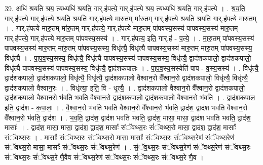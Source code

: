 \documentclass[17pt]{extarticle}
\begin{document}
39. अधि॑ श्रयति श्रय॒ त्यध्यधि॑ श्रयति॒ गार्.ह॑पत्ये॒ गार्.ह॑पत्ये श्रय॒ त्यध्यधि॑ श्रयति॒ गार्.ह॑पत्ये । . श्र॒य॒ति॒ गार्.ह॑पत्ये॒ गार्.ह॑पत्ये श्रयति श्रयति॒ गार्.ह॑पत्ये मारु॒तम् मा॑रु॒तम् गार्.ह॑पत्ये श्रयति श्रयति॒ गार्.ह॑पत्ये मारु॒तम् । . गार्.ह॑पत्ये मारु॒तम् मा॑रु॒तम् गार्.ह॑पत्ये॒ गार्.ह॑पत्ये मारु॒तम् पा॑पवस्य॒सस्य॑ पापवस्य॒सस्य॑ मारु॒तम् गार्.ह॑पत्ये॒ गार्.ह॑पत्ये मारु॒तम् पा॑पवस्य॒सस्य॑ । . गार्.ह॑पत्य॒ इति॒ गार्.ह॑ - प॒त्ये॒ । . मा॒रु॒तम् पा॑पवस्य॒सस्य॑ पापवस्य॒सस्य॑ मारु॒तम् मा॑रु॒तम् पा॑पवस्य॒सस्य॒ विधृ॑त्यै॒ विधृ॑त्यै पापवस्य॒सस्य॑ मारु॒तम् मा॑रु॒तम् पा॑पवस्य॒सस्य॒ विधृ॑त्यै । . पा॒प॒व॒स्य॒सस्य॒ विधृ॑त्यै॒ विधृ॑त्यै पापवस्य॒सस्य॑ पापवस्य॒सस्य॒ विधृ॑त्यै॒ द्वाद॑शकपालो॒ द्वाद॑शकपालो॒ विधृ॑त्यै पापवस्य॒सस्य॑ पापवस्य॒सस्य॒ विधृ॑त्यै॒ द्वाद॑शकपालः । . पा॒प॒व॒स्य॒सस्येति॑ पाप - व॒स्य॒सस्य॑ । . विधृ॑त्यै॒ द्वाद॑शकपालो॒ द्वाद॑शकपालो॒ विधृ॑त्यै॒ विधृ॑त्यै॒ द्वाद॑शकपालो वैश्वान॒रो वै᳚श्वान॒रो द्वाद॑शकपालो॒ विधृ॑त्यै॒ विधृ॑त्यै॒ द्वाद॑शकपालो वैश्वान॒रः । . विधृ॑त्या॒ इति॒ वि - धृ॒त्यै॒ । . द्वाद॑शकपालो वैश्वान॒रो वै᳚श्वान॒रो द्वाद॑शकपालो॒ द्वाद॑शकपालो वैश्वान॒रो भ॑वति भवति वैश्वान॒रो द्वाद॑शकपालो॒ द्वाद॑शकपालो वैश्वान॒रो भ॑वति । . द्वाद॑शकपाल॒ इति॒ द्वाद॑श - क॒पा॒लः॒ । . वै॒श्वा॒न॒रो भ॑वति भवति वैश्वान॒रो वै᳚श्वान॒रो भ॑वति॒ द्वाद॑श॒ द्वाद॑श भवति वैश्वान॒रो वै᳚श्वान॒रो भ॑वति॒ द्वाद॑श । . भ॒व॒ति॒ द्वाद॑श॒ द्वाद॑श भवति भवति॒ द्वाद॑श॒ मासा॒ मासा॒ द्वाद॑श भवति भवति॒ द्वाद॑श॒ मासाः᳚ । . द्वाद॑श॒ मासा॒ मासा॒ द्वाद॑श॒ द्वाद॑श॒ मासाः᳚ संॅवथ्स॒रः सं॑ॅवथ्स॒रो मासा॒ द्वाद॑श॒ द्वाद॑श॒ मासाः᳚ संॅवथ्स॒रः । . मासाः᳚ संॅवथ्स॒रः सं॑ॅवथ्स॒रो मासा॒ मासाः᳚ संॅवथ्स॒रः सं॑ॅवथ्स॒रेण॑ संॅवथ्स॒रेण॑ संॅवथ्स॒रो मासा॒ मासाः᳚ संॅवथ्स॒रः सं॑ॅवथ्स॒रेण॑ । . सं॒ॅव॒थ्स॒रः सं॑ॅवथ्स॒रेण॑ संॅवथ्स॒रेण॑ संॅवथ्स॒रः सं॑ॅवथ्स॒रः 
सं॑ॅवथ्स॒रे णै॒वैव सं॑ॅवथ्स॒रेण॑ संॅवथ्स॒रः सं॑ॅवथ्स॒रः सं॑ॅवथ्स॒रे णै॒व । \newline
\end{document}
